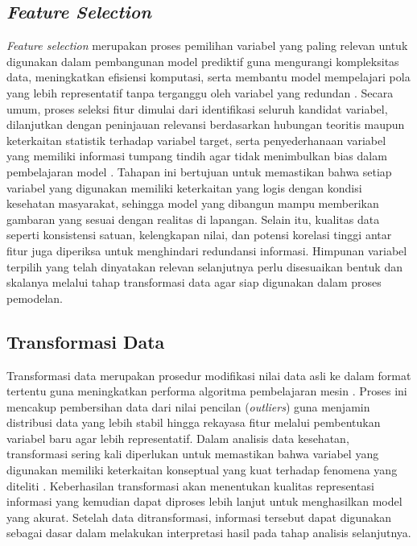\subsection{\textit{Feature Selection}}
\textit{Feature selection} merupakan proses pemilihan variabel yang paling relevan untuk digunakan dalam pembangunan model prediktif guna mengurangi kompleksitas data, meningkatkan efisiensi komputasi, serta membantu model mempelajari pola yang lebih representatif tanpa terganggu oleh variabel yang redundan \cite{james2021islr}. Secara umum, proses seleksi fitur dimulai dari identifikasi seluruh kandidat variabel, dilanjutkan dengan peninjauan relevansi berdasarkan hubungan teoritis maupun keterkaitan statistik terhadap variabel target, serta penyederhanaan variabel yang memiliki informasi tumpang tindih agar tidak menimbulkan bias dalam pembelajaran model \cite{id2021machine, hastie2009elements}. Tahapan ini bertujuan untuk memastikan bahwa setiap variabel yang digunakan memiliki keterkaitan yang logis dengan kondisi kesehatan masyarakat, sehingga model yang dibangun mampu memberikan gambaran yang sesuai dengan realitas di lapangan. Selain itu, kualitas data seperti konsistensi satuan, kelengkapan nilai, dan potensi korelasi tinggi antar fitur juga diperiksa untuk menghindari redundansi informasi. Himpunan variabel terpilih yang telah dinyatakan relevan selanjutnya perlu disesuaikan bentuk dan skalanya melalui tahap transformasi data agar siap digunakan dalam proses pemodelan.

\subsection{Transformasi Data}
Transformasi data merupakan prosedur modifikasi nilai data asli ke dalam format tertentu guna meningkatkan performa algoritma pembelajaran mesin \cite{hastie2009elements}. Proses ini mencakup pembersihan data dari nilai pencilan (\textit{outliers}) guna menjamin distribusi data yang lebih stabil hingga rekayasa fitur melalui pembentukan variabel baru agar lebih representatif. Dalam analisis data kesehatan, transformasi sering kali diperlukan untuk memastikan bahwa variabel yang digunakan memiliki keterkaitan konseptual yang kuat terhadap fenomena yang diteliti \cite{hastie2009elements,shen2023machine}. Keberhasilan transformasi akan menentukan kualitas representasi informasi yang kemudian dapat diproses lebih lanjut untuk menghasilkan model yang akurat. Setelah data ditransformasi, informasi tersebut dapat digunakan sebagai dasar dalam melakukan interpretasi hasil pada tahap analisis selanjutnya.

